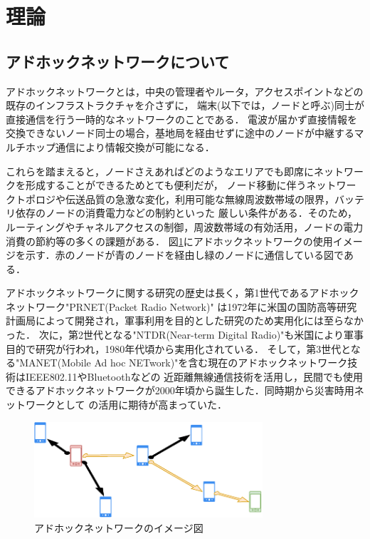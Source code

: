 \documentclass[a4paper, 11pt]{ltjsarticle}
\begin{document}
\clearpage
\section{理論}
\subsection{アドホックネットワークについて} \label{about_ad-hoc}
アドホックネットワークとは，中央の管理者やルータ，アクセスポイントなどの既存のインフラストラクチャを介さずに，
端末(以下では，ノードと呼ぶ)同士が直接通信を行う一時的なネットワークのことである．
電波が届かず直接情報を交換できないノード同士の場合，基地局を経由せずに途中のノードが中継するマルチホップ通信により情報交換が可能になる．

これらを踏まえると，ノードさえあればどのようなエリアでも即席にネットワークを形成することができるためとても便利だが，
ノード移動に伴うネットワークトポロジや伝送品質の急激な変化，利用可能な無線周波数帯域の限界，バッテリ依存のノードの消費電力などの制約といった
厳しい条件がある．そのため，ルーティングやチャネルアクセスの制御，周波数帯域の有効活用，ノードの電力消費の節約等の多くの課題がある\cite{間瀬憲一2001アドホックネットワーク}．
図\ref{ad-hoc_model}にアドホックネットワークの使用イメージを示す．赤のノードが青のノードを経由し緑のノードに通信している図である．

アドホックネットワークに関する研究の歴史は長く，第1世代であるアドホックネットワーク"PRNET(Packet Radio Network)"
は1972年に米国の国防高等研究計画局によって開発され，軍事利用を目的とした研究のため実用化には至らなかった．
次に，第2世代となる"NTDR(Near-term Digital Radio)"も米国により軍事目的で研究が行われ，1980年代頃から実用化されている．
そして，第3世代となる"MANET(Mobile Ad hoc NETwork)"を含む現在のアドホックネットワーク技術はIEEE802.11やBluetoothなどの
近距離無線通信技術を活用し，民間でも使用できるアドホックネットワークが2000年頃から誕生した．同時期から災害時用ネットワークとして
の活用に期待が高まっていた．

\begin{figure}[H]
  \centering
  \includegraphics[width=85mm]{ad-hoc_model.pdf}
  \caption{アドホックネットワークのイメージ図}
  \label{ad-hoc_model}
\end{figure}
\end{document}
